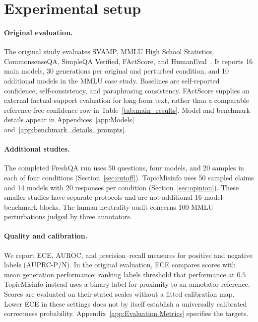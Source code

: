 \documentclass[11pt]{article}
\theoremstyle{plain}
\theoremstyle{definition}
\theoremstyle{remark}
\newif\ifrevisionmarkup
\DeclareRobustCommand{\revisioncolor}{\ifrevisionmarkup\color{red}\fi}
\newenvironment{revision}{\par\begingroup\revisioncolor}{\par\endgroup}
\begin{document}
\begin{revision}
\section{Experimental setup}
\paragraph{Original evaluation.}
The original study evaluates SVAMP, MMLU High School Statistics, CommonsenseQA, SimpleQA Verified, FActScore, and HumanEval~\citep{patel-etal-2021-nlp,hendryckstest2021,talmor-etal-2019-commonsenseqa,haas2025simpleqaverifiedreliablefactuality,min-etal-2023-factscore,DBLP:journals/corr/abs-2107-03374}. It reports 16 main models, 30 generations per original and perturbed condition, and 10 additional models in the MMLU case study. Baselines are self-reported confidence, self-consistency, and paraphrasing consistency. FActScore supplies an external factual-support evaluation for long-form text, rather than a comparable reference-free confidence row in Table~\ref{tab:main_results}. Model and benchmark details appear in Appendices~\ref{app:Models} and~\ref{app:benchmark_details_prompts}.

\paragraph{Additional studies.}
The completed FreshQA run uses 50 questions, four models, and 20 samples in each of four conditions (Section~\ref{sec:cutoff}). TopicMisinfo uses 50 sampled claims and 14 models with 20 responses per condition (Section~\ref{sec:opinion}). These smaller studies have separate protocols and are not additional 16-model benchmark blocks. The human neutrality audit concerns 100 MMLU perturbations judged by three annotators.

\paragraph{Quality and calibration.}
We report ECE, AUROC, and precision--recall measures for positive and negative labels (AUPRC-P/N). In the original evaluation, ECE compares scores with mean generation performance; ranking labels threshold that performance at $0.5$. TopicMisinfo instead uses a binary label for proximity to an annotator reference. Scores are evaluated on their stated scales without a fitted calibration map. Lower ECE in these settings does not by itself establish a universally calibrated correctness probability. Appendix~\ref{app:Evaluation Metrics} specifies the targets.


\end{revision}
\end{document}
